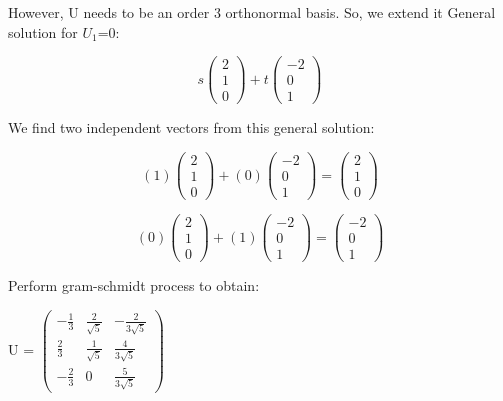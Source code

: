 \documentclass{article}
\begin{document}
However, U needs to be an order 3 orthonormal basis. So, we extend it
General solution for $U_1$=0:
\begin{center}
    \[
    s\begin{pmatrix}
        2\\1\\0
    \end{pmatrix} + t\begin{pmatrix}
        -2\\0\\1
    \end{pmatrix}
    \]
\end{center}
We find two independent vectors from this general solution:
\begin{center}
    \[
    (1)\begin{pmatrix}
        2\\1\\0
    \end{pmatrix} + (0)\begin{pmatrix}
        -2\\0\\1
    \end{pmatrix} = 
    \begin{pmatrix}
        2\\1\\0
    \end{pmatrix}
    \]
\end{center}
\begin{center}
    \[
    (0)\begin{pmatrix}
        2\\1\\0
    \end{pmatrix} + (1)\begin{pmatrix}
        -2\\0\\1
    \end{pmatrix} = 
    \begin{pmatrix}
        -2\\0\\1
    \end{pmatrix}
    \]
\end{center}

Perform gram-schmidt process to obtain:
\begin{center}
    U = $\begin{pmatrix}
        -\frac{1}{3} & \frac{2}{\sqrt{5}} & -\frac{2}{3\sqrt{5}} \\
\frac{2}{3} & \frac{1}{\sqrt{5}} & \frac{4}{3\sqrt{5}} \\
-\frac{2}{3} & 0 & \frac{5}{3\sqrt{5}}
    \end{pmatrix}$
\end{center}
\end{document}
